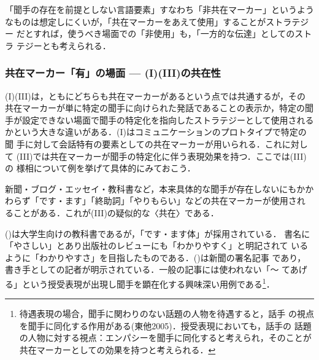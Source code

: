 \documentclass[japanese]{jnlp_1.3c}
\begin{document}

「聞手の存在を前提としない言語要素」すなわち「非共在マーカー」というよう
なものは想定しにくいが，「共在マーカーをあえて使用」することがストラテジー
だとすれば，使うべき場面での「非使用」も，「一方的な伝達」としてのストラ
テジーとも考えられる．

\subsubsection{共在マーカー「有」の場面 --- (I)(III)の共在性}

(I)(III)は，ともにどちらも共在マーカーがあるという点では共通するが，その
共在マーカーが単に特定の聞手に向けられた発話であることの表示か，特定の聞
手が設定できない場面で聞手の特定化を指向したストラテジーとして使用される
かという大きな違いがある．(I)はコミュニケーションのプロトタイプで特定の聞
手に対して会話特有の要素としての共在マーカーが用いられる．これに対して
(III)では共在マーカーが聞手の特定化に伴う表現効果を持つ．ここでは(III)の
様相について例を挙げて具体的にみておこう．

新聞・ブログ・エッセイ・教科書など，本来具体的な聞手が存在しないにもかか
わらず「です・ます」「終助詞」「やりもらい」などの共在マーカーが使用され
ることがある．これが(III)の疑似的な〈共在〉である．

()は大学生向けの教科書であるが，「です・ます体」が採用されている．
書名に「やさしい」とあり出版社のレビューにも「わかりやすく」と明記されて
いるように「わかりやすさ」を目指したものである．()は新聞の署名記事
であり，書き手としての記者が明示されている．一般の記事には使われない「〜
てあげる」という授受表現が出現し聞手を顕在化する興味深い用例である\footnote{
	待遇表現の場合，聞手に関わりのない話題の人物を待遇すると，話手
	の視点を聞手に同化する作用がある(東他2005)．授受表現においても，話手の
	話題の人物に対する視点：エンパシーを聞手に同化すると考えられ，そのことが
	共在マーカーとしての効果を持つと考えられる．}．

\end{document}
